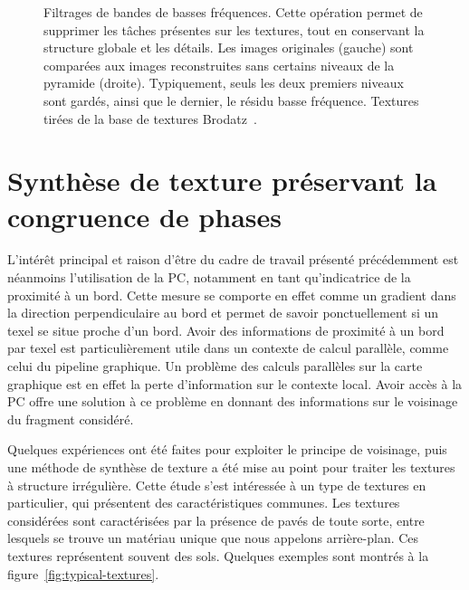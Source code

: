 \begin{figure}
    \caption[Filtrage de bandes de basses fréquences]{Filtrages de bandes de basses fréquences. Cette opération permet de supprimer les tâches présentes sur les textures, tout en conservant la structure globale et les détails. Les images originales (gauche) sont comparées aux images reconstruites sans certains niveaux de la pyramide (droite). Typiquement, seuls les deux premiers niveaux sont gardés, ainsi que le dernier, le résidu basse fréquence. Textures tirées de la base de textures Brodatz~\cite{abdelmounaime_new_2013}.}
    \label{fig:filter-low-freq}
\end{figure}

\section{Synthèse de texture préservant la congruence de phases}

L'intérêt principal et raison d'être du cadre de travail présenté précédemment est néanmoins l'utilisation de la PC, notamment en tant qu'indicatrice de la proximité à un bord. Cette mesure se comporte en effet comme un gradient dans la direction perpendiculaire au bord et permet de savoir ponctuellement si un texel se situe proche d'un bord. Avoir des informations de proximité à un bord par texel est particulièrement utile dans un contexte de calcul parallèle, comme celui du pipeline graphique. Un problème des calculs parallèles sur la carte graphique est en effet la perte d'information sur le contexte local. Avoir accès à la PC offre une solution à ce problème en donnant des informations sur le voisinage du fragment considéré.

\bigskip

Quelques expériences ont été faites pour exploiter le principe de voisinage, puis une méthode de synthèse de texture a été mise au point pour traiter les textures à structure irrégulière. Cette étude s'est intéressée à un type de textures en particulier, qui présentent des caractéristiques communes. Les textures considérées sont caractérisées par la présence de pavés de toute sorte, entre lesquels se trouve un matériau unique que nous appelons arrière-plan. Ces textures représentent souvent des sols. Quelques exemples sont montrés à la figure~\ref{fig:typical-textures}.

\bigskip

